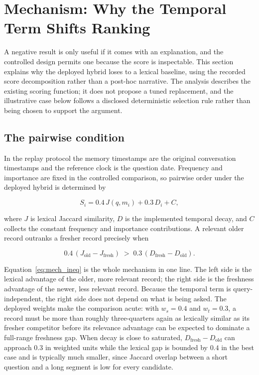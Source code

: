 \section{Mechanism: Why the Temporal Term Shifts Ranking}

\label{sec:mechanism}

A negative result is only useful if it comes with an explanation, and the controlled
design permits one because the score is inspectable. This section explains why the
deployed hybrid loses to a lexical baseline, using the recorded score decomposition
rather than a post-hoc narrative. The analysis describes the existing scoring function;
it does not propose a tuned replacement, and the illustrative case below follows a
disclosed deterministic selection rule rather than being chosen to support the
argument.

\subsection{The pairwise condition}

\label{sec:mech_condition}

In the replay protocol the memory timestamps are the original conversation timestamps
and the reference clock is the question date. Frequency and importance are fixed in
the controlled comparison, so pairwise order under the deployed hybrid is determined by

\begin{equation}
  S_i = 0.4\,J(q,m_i) + 0.3\,D_i + C,
  \label{eq:mech_score}
\end{equation}

where $J$ is lexical Jaccard similarity, $D$ is the implemented temporal decay, and $C$
collects the constant frequency and importance contributions. A relevant older record
outranks a fresher record precisely when

\begin{equation}
  0.4\,(J_{\mathrm{old}} - J_{\mathrm{fresh}})
  \;>\; 0.3\,(D_{\mathrm{fresh}} - D_{\mathrm{old}}).
  \label{eq:mech_ineq}
\end{equation}

Equation~\ref{eq:mech_ineq} is the whole mechanism in one line. The left side is the
lexical advantage of the older, more relevant record; the right side is the freshness
advantage of the newer, less relevant record. Because the temporal term is
query-independent, the right side does not depend on what is being asked. The deployed
weights make the comparison acute: with $w_s=0.4$ and $w_t=0.3$, a record must be more
than roughly three-quarters again as lexically similar as its fresher competitor before
its relevance advantage can be expected to dominate a full-range freshness gap. When
decay is close to saturated, $D_{\mathrm{fresh}}-D_{\mathrm{old}}$ can approach $0.3$
in weighted units while the lexical gap is bounded by $0.4$ in the best case and is
typically much smaller, since Jaccard overlap between a short question and a long
segment is low for every candidate.


